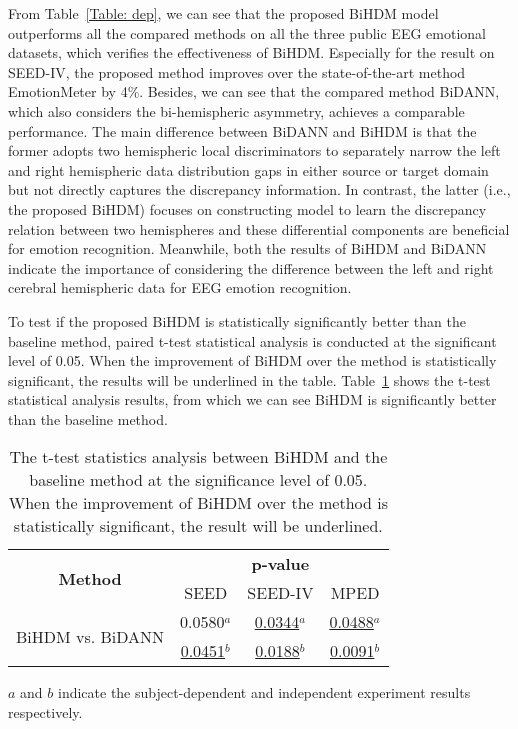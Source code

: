 \documentclass[journal]{IEEEtran}
\begin{document}
From Table~\ref{Table: dep}, we can see that the proposed BiHDM model outperforms all the compared methods on all the three public EEG emotional datasets, which verifies the effectiveness of BiHDM. Especially for the result on SEED-IV, the proposed method improves over the state-of-the-art method EmotionMeter by 4$\%$. Besides, we can see that the compared method BiDANN, which also considers the bi-hemispheric asymmetry, achieves a comparable performance. The main difference between BiDANN and BiHDM is that the former adopts two hemispheric local discriminators to separately narrow the left and right hemispheric data distribution gaps in either source or target domain but not directly captures the discrepancy information. In contrast, the latter (i.e., the proposed BiHDM) focuses on constructing model to learn the discrepancy relation between two hemispheres and these differential components are beneficial for emotion recognition. Meanwhile, both the results of BiHDM and BiDANN indicate the importance of considering the difference between the left and right cerebral hemispheric data for EEG emotion recognition.  

To test if the proposed BiHDM is statistically significantly better than the baseline method, paired t-test statistical analysis is conducted at the significant level of 0.05. When the improvement of BiHDM over the method is statistically significant, the results will be underlined in the table. Table~\ref{Table: t-test} shows the t-test statistical analysis results, from which we can see BiHDM is significantly better than the baseline method.
\begin{table}[htb]
	\caption{The t-test statistics analysis between BiHDM and the baseline method at the significance
		level of 0.05. When the improvement of BiHDM over the method is statistically significant, the result will be underlined. }
	\centering
	\renewcommand{\arraystretch}{1.3}
	\begin{threeparttable}		
		\begin{tabular}{|c|ccc|} \hline
			\multirow{2}{*}{\textbf{Method}} & \multicolumn{3}{c|}{\textbf{p-value}} \\ \cline{2-4}
			&  SEED            & SEED-IV          &   MPED\\ \hline
			\multirow{2}{*}{{BiHDM vs. BiDANN}} & 0.0580$^a$ & \underline{0.0344}$^a$ & \underline{0.0488}$^a$\\ 
			           & \underline{0.0451}$^b$ & \underline{0.0188}$^b$& \underline{0.0091}$^b$\\ \hline
		\end{tabular}
		\begin{tablenotes}[para]
			\footnotesize $a$ and $b$ indicate the subject-dependent and independent experiment results respectively.
		\end{tablenotes}
	\end{threeparttable}
	\label{Table: t-test}
\end{table}
\end{document}
